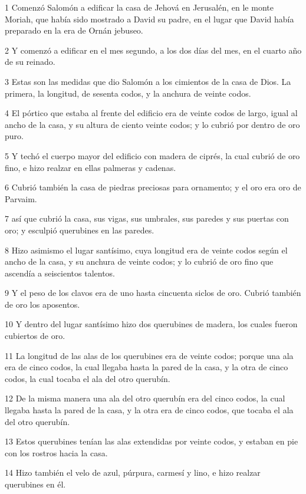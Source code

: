 \par 1 Comenzó Salomón a edificar la casa de Jehová en Jerusalén, en le monte Moriah, que había sido mostrado a David su padre, en el lugar que David había preparado en la era de Ornán jebuseo.
\par 2 Y comenzó a edificar en el mes segundo, a los dos días del mes, en el cuarto año de su reinado.
\par 3 Estas son las medidas que dio Salomón a los cimientos de la casa de Dios. La primera, la longitud, de sesenta codos,  y la anchura de veinte codos.
\par 4 El pórtico que estaba al frente del edificio era de veinte codos   de largo, igual al ancho de la casa, y su altura de ciento veinte codos; y lo cubrió por dentro de oro puro.
\par 5 Y techó el cuerpo mayor del edificio con madera de ciprés, la cual cubrió de oro fino, e hizo realzar en ellas palmeras y cadenas.
\par 6 Cubrió también la casa de piedras preciosas para ornamento; y el oro era oro de Parvaim.
\par 7 así que cubrió la casa, sus vigas, sus umbrales, sus paredes y sus puertas con oro; y esculpió querubines en las paredes.
\par 8 Hizo asimismo el lugar santísimo, cuya longitud era de veinte codos   según el ancho de la casa, y su anchura de veinte codos; y lo cubrió de oro fino que ascendía a seiscientos talentos.
\par 9 Y el peso de los clavos era de uno hasta cincuenta siclos de oro.  Cubrió también de oro los aposentos.
\par 10 Y dentro del lugar santísimo hizo dos querubines de madera, los cuales fueron cubiertos de oro.
\par 11 La longitud de las alas de los querubines era de veinte codos;  porque una ala era de cinco codos, la cual llegaba hasta la pared de la casa, y la otra de cinco codos, la cual tocaba el ala del otro querubín.
\par 12 De la misma manera una ala del otro querubín era del cinco codos,  la cual llegaba hasta la pared de la casa, y la otra era de cinco codos, que tocaba el ala del otro querubín.
\par 13 Estos querubines tenían las alas extendidas por veinte codos,  y estaban en pie con los rostros hacia la casa.
\par 14 Hizo también el velo de azul, púrpura, carmesí y lino, e hizo realzar querubines en él.

